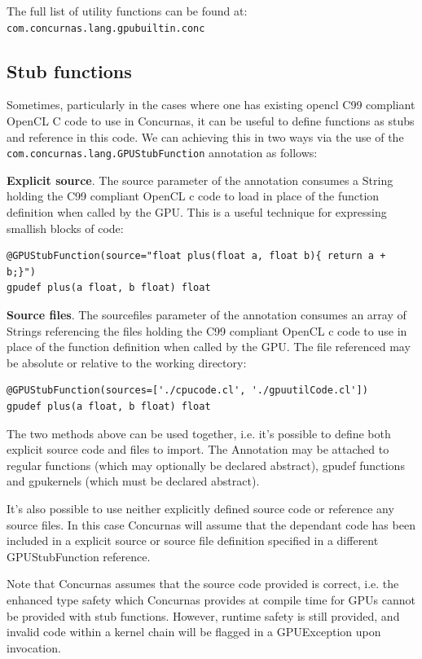 \documentclass[conc-doc]{subfiles}
\begin{document}
The full list of utility functions can be found at: \lstinline{com.concurnas.lang.gpubuiltin.conc}

\subsection{Stub functions}
Sometimes, particularly in the cases where one has existing opencl C99 compliant OpenCL C code to use in Concurnas, it can be useful to define functions as stubs and reference in this code. We can achieving this in two ways via the use of the \lstinline{com.concurnas.lang.GPUStubFunction} annotation as follows:

\textbf{Explicit source}. The source parameter of the annotation consumes a String holding the C99 compliant OpenCL c code to load in place of the function definition when called by the GPU. This is a useful technique for expressing smallish blocks of code:

\begin{lstlisting}
@GPUStubFunction(source="float plus(float a, float b){ return a + b;}")
gpudef plus(a float, b float) float
\end{lstlisting}

\textbf{Source files}. The sourcefiles parameter of the annotation consumes an array of Strings referencing the files holding the C99 compliant OpenCL c code to use in place of the function definition when called by the GPU. The file referenced may be absolute or relative to the working directory:

\begin{lstlisting}
@GPUStubFunction(sources=['./cpucode.cl', './gpuutilCode.cl'])
gpudef plus(a float, b float) float
\end{lstlisting}

The two methods above can be used together, i.e. it's possible to define both explicit source code and files to import. The Annotation may be attached to regular functions (which may optionally be declared abstract), gpudef functions and gpukernels (which must be declared abstract).

It's also possible to use neither explicitly defined source code or reference any source files. In this case Concurnas will assume that the dependant code has been included in a explicit source or source file definition specified in a different GPUStubFunction reference.

Note that Concurnas assumes that the source code provided is correct, i.e. the enhanced type safety which Concurnas provides at compile time for GPUs cannot be provided with stub functions. However, runtime safety is still provided, and invalid code within a kernel chain will be flagged in a GPUException upon invocation.
\end{document}
